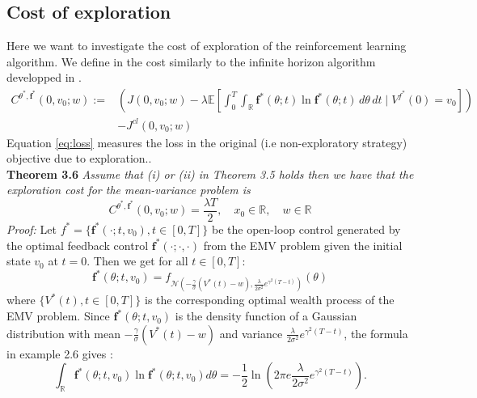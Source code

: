 \documentclass[oneside, a4paper, onecolumn, 11pt]{article}
\begin{document}
\subsection{Cost of exploration}
Here we want to investigate the cost of exploration of the reinforcement learning algorithm.
We define in the cost similarly to the infinite horizon algorithm developped in \cite{WangZariZhou2020}. 
\begin{equation}
\begin{aligned}   
    C^{\theta^*, \boldsymbol{f}^*}(0, v_0; w) := &\left( J(0, v_0; w) - \lambda \mathbb{E} \left[ \int_0^T \int_{\mathbb{R}} \boldsymbol{f}^*(\theta;t) \ln \boldsymbol{f}^*(\theta;t) \, d\theta \, dt \mid V^{f^*}(0) = v_0 \right] \right) \\
    &- J^{cl}(0, v_0; w)
\end{aligned}
\label{eq:loss}
\end{equation}
Equation \eqref{eq:loss} measures the loss in the original (i.e non-exploratory strategy) objective due to exploration.\cite{WangZhou2020}. 
\\
\textbf{Theorem 3.6}\cite{WangZhou2020}\textit{ Assume that (i) or (ii) in Theorem 3.5 holds then we have that the exploration cost for the mean-variance problem is}
\begin{equation}
C^{\theta^*, \boldsymbol{f}^*}(0, v_0; w) = \frac{\lambda T}{2},\quad x_0 \in  \mathbb{R}, \quad w\in \mathbb{R}
\end{equation}
\textit{Proof:} 
Let $f^*=\{\boldsymbol{f}^*(\cdot;t, v_0), t\in [0,T]\}$ be the open-loop control generated by the optimal feedback control $\boldsymbol{f}^*(\cdot; \cdot,\cdot)$ from the EMV problem given the initial state $v_0$ at $t=0$.  
Then we get for all $t\in [0,T]$:
\begin{equation}
    \boldsymbol{f}^*(\theta;t, v_0) = f_{\mathcal{N}\left(-\frac{\gamma}{\sigma}(V^*(t)-w),\frac{\lambda}{2\sigma^2}e^{\gamma^2(T-t)}\right)}(\theta)   
\end{equation}
where $\{V^*(t), t\in [0,T]\}$ is the corresponding optimal wealth process of the EMV problem.
Since $\boldsymbol{f}^*(\theta;t, v_0)$ is the density function of a Gaussian distribution with mean $-\frac{\gamma}{\sigma}(V^*(t) - w)$ and variance $\frac{\lambda}{2\sigma^2}e^{\gamma^2(T-t)}$,  the formula  in example 2.6 gives : 
\begin{equation}
\int_{\mathbb{R}} \boldsymbol{f}^*(\theta;t, v_0)\ln{\boldsymbol{f}^*(\theta;t, v_0)}d\theta = -\frac{1}{2}\ln\left(2\pi e \frac{\lambda}{2\sigma^2}e^{\gamma^2(T-t)}\right).
\end{equation}
\end{document}
